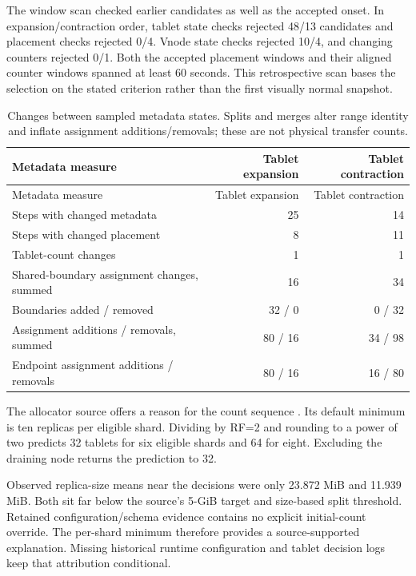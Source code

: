 The window scan checked earlier candidates as well as the accepted onset. In expansion/contraction order, tablet state checks rejected 48/13 candidates and placement checks rejected 0/4. Vnode state checks rejected 10/4, and changing counters rejected 0/1. Both the accepted placement windows and their aligned counter windows spanned at least 60 seconds. This retrospective scan bases the selection on the stated criterion rather than the first visually normal snapshot.

\begin{longtable}[]{@{}lrr@{}}
\caption{Changes between sampled metadata states. Splits and merges
alter range identity and inflate assignment additions/removals; these
are not physical transfer counts. \label{tab:B1}}\tabularnewline
\toprule\noalign{}
Metadata measure & Tablet expansion & Tablet contraction \\
\midrule\noalign{}
\endfirsthead
\toprule\noalign{}
Metadata measure & Tablet expansion & Tablet contraction \\
\midrule\noalign{}
\endhead
\bottomrule\noalign{}
\endlastfoot
Steps with changed metadata & 25 & 14 \\
Steps with changed placement & 8 & 11 \\
Tablet-count changes & 1 & 1 \\
Shared-boundary assignment changes, summed & 16 & 34 \\
Boundaries added / removed & 32 / 0 & 0 / 32 \\
Assignment additions / removals, summed & 80 / 16 & 34 / 98 \\
Endpoint assignment additions / removals & 80 / 16 & 16 / 80 \\
\end{longtable}

The allocator source offers a reason for the count sequence \cite{r22}. Its default minimum is ten replicas per eligible shard. Dividing by RF=2 and rounding to a power of two predicts 32 tablets for six eligible shards and 64 for eight. Excluding the draining node returns the prediction to 32.

Observed replica-size means near the decisions were only 23.872 MiB and 11.939 MiB. Both sit far below the source's 5-GiB target and size-based split threshold. Retained configuration/schema evidence contains no explicit initial-count override. The per-shard minimum therefore provides a source-supported explanation. Missing historical runtime configuration and tablet decision logs keep that attribution conditional.

